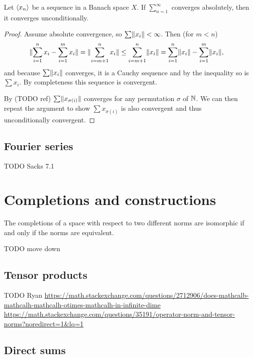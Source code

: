 \begin{proposition} \label{absoluteUnconditionalConvergenceBanach}
Let $\left\langle x_n \right\rangle$ be a sequence in a Banach space $X$. If $\sum_{n=1}^\infty$ converges absolutely, then it converges unconditionally.
\end{proposition}
\begin{proof}
Assume absolute convergence, so $\sum\lVert x_i\rVert<\infty$. Then (for $m< n$)
\[ \lVert\sum_{i=1}^n x_i - \sum_{i=1}^m x_i\rVert = \lVert\sum_{i=m+1}^n x_i\rVert \leq \sum_{i=m+1}^n\lVert x_i\rVert = \sum_{i=1}^n \lVert x_i\rVert - \sum_{i=1}^m \lVert x_i\rVert, \]
and because $\sum\lVert x_i\rVert$ converges, it is a Cauchy sequence and by the inequality so is $\sum x_i$. By completeness this sequence is convergent.

By (TODO ref) $\sum\lVert x_{\sigma(i)}\rVert$ converges for any permutation $\sigma$ of $\mathbb{N}$. We can then repeat the argument to show $\sum x_{\sigma(i)}$ is also convergent and thus unconditionally convergent.
\end{proof}

\subsection{Fourier series}
TODO Sacks 7.1

\section{Completions and constructions}

\begin{proposition}
The completions of a space with respect to two different norms are isomorphic \textup{if and only if} the norms are equivalent.
\end{proposition}

TODO move down
\subsection{Tensor products}
TODO Ryan
\url{https://math.stackexchange.com/questions/2712906/does-mathcalb-mathcalh-mathcalh-otimes-mathcalh-in-infinite-dime}
\url{https://math.stackexchange.com/questions/35191/operator-norm-and-tensor-norms?noredirect=1&lq=1}

\subsection{Direct sums}


